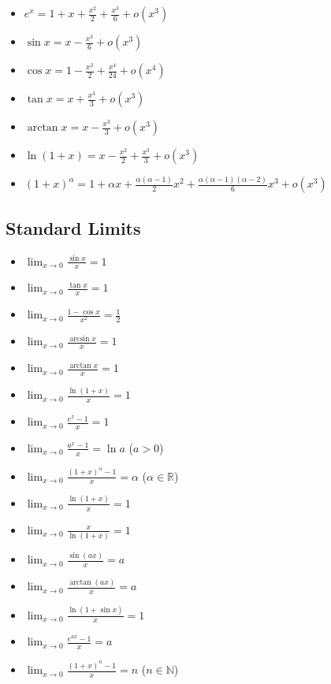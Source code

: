 \begin{cascade}
	\begin{itemize}
		\item $e^x = 1 + x + \frac{x^2}{2} + \frac{x^3}{6} + o(x^3)$
		\item $\sin x = x - \frac{x^3}{6} + o(x^3)$
		\item $\cos x = 1 - \frac{x^2}{2} + \frac{x^4}{24} + o(x^4)$
		\item $\tan x = x + \frac{x^3}{3} + o(x^3)$
		\item $\arctan x = x - \frac{x^3}{3} + o(x^3)$
		\item $\ln(1+x) = x - \frac{x^2}{2} + \frac{x^3}{3} + o(x^3)$
		\item $(1+x)^\alpha = 1 + \alpha x + \frac{\alpha(\alpha-1)}{2}x^2 + \frac{\alpha(\alpha-1)(\alpha-2)}{6}x^3 + o(x^3)$
	\end{itemize}
\end{cascade}

\subsection*{Standard Limits}

\begin{cascade}
	\begin{itemize}
		\item $\displaystyle \lim_{x \to 0} \frac{\sin x}{x} = 1$
		\item $\displaystyle \lim_{x \to 0} \frac{\tan x}{x} = 1$
		\item $\displaystyle \lim_{x \to 0} \frac{1 - \cos x}{x^2} = \frac{1}{2}$
		\item $\displaystyle \lim_{x \to 0} \frac{\arcsin x}{x} = 1$
		\item $\displaystyle \lim_{x \to 0} \frac{\arctan x}{x} = 1$
		\item $\displaystyle \lim_{x \to 0} \frac{\ln(1+x)}{x} = 1$
		\item $\displaystyle \lim_{x \to 0} \frac{e^x - 1}{x} = 1$
		\item $\displaystyle \lim_{x \to 0} \frac{a^x - 1}{x} = \ln a$ ($a>0$)
		\item $\displaystyle \lim_{x \to 0} \frac{(1+x)^\alpha - 1}{x} = \alpha$ ($\alpha \in \mathbb{R}$)
		\item $\displaystyle \lim_{x \to 0} \frac{\ln(1+x)}{x} = 1$
		\item $\displaystyle \lim_{x \to 0} \frac{x}{\ln(1+x)} = 1$
		\item $\displaystyle \lim_{x \to 0} \frac{\sin(ax)}{x} = a$
		\item $\displaystyle \lim_{x \to 0} \frac{\arctan(ax)}{x} = a$
		\item $\displaystyle \lim_{x \to 0} \frac{\ln(1+\sin x)}{x} = 1$
		\item $\displaystyle \lim_{x \to 0} \frac{e^{ax} - 1}{x} = a$
		\item $\displaystyle \lim_{x \to 0} \frac{(1+x)^n - 1}{x} = n$ ($n \in \mathbb{N}$)
	\end{itemize}
\end{cascade}

